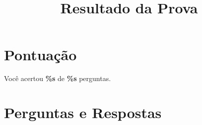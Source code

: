 \documentclass[a4paper,12pt]{article}
\begin{document}
\title{Resultado da Prova}
\author{}
\date{}
\maketitle

\section*{Pontuação}
Você acertou \textbf{\%s} de \textbf{\%s} perguntas.

\section*{Perguntas e Respostas}

\begin{enumerate}
\end{enumerate}
\end{document}
